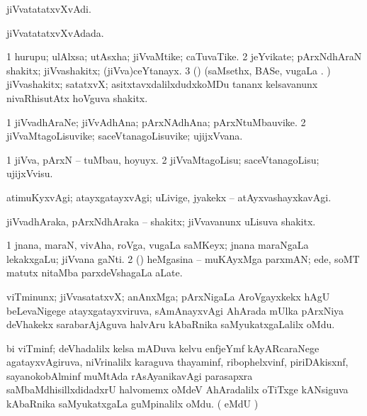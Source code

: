 {{{{{{{{{{{\bentry 
{} 
\gl{\nA}
\expl{}
\bmng
jiVvatatatxvXvAdi. 
\emng
\eentry

\bentry 
{} 
\gl{\gu}
\expl{}
\bmng
jiVvatatatxvXvAdada. 
\emng
\eentry

\bentry
{} 
\gl{\nA}
\expl{}
\bmng
\bnum
\num{1} hurupu; ulAlxsa; utAsxha; jiVvaMtike; caTuvaTike. 
\num{2} jeYvikate; pArxNdhAraN shakitx; jiVvashakitx; (jiVva)ceYtanayx. 
\num{3} (\rUpa) (saMsethx, BASe, \mo vugaLa \vi. ) jiVvashakitx; satatxvX; asitxtavxdalilxdudxkoMDu tananx kelsavanunx nivaRhisutAtx hoVguva shakitx. 
\enum
\emng
\eentry

\bentry
{} 
\gl{\nA}
\expl{}
\bmng
\bnum
\num{1} jiVvadhAraNe; jiVvAdhAna; pArxNAdhAna; pArxNtuMbauvike. 
\num{2} jiVvaMtagoLisuvike; saceVtanagoLisuvike; ujijxVvana. 
\enum
\emng
\eentry

\bentry 
{} 
\gl{\sakirx}
\expl{}
\bmng
\bnum
\num{1} jiVva, pArxN -- tuMbau, hoyuyx. 
\num{2} jiVvaMtagoLisu; saceVtanagoLisu; ujijxVvisu. 
\enum
\emng
\eentry

\bentry 
{} 
\gl{\kirxvi}
\expl{}
\bmng
 atimuKyxvAgi; atayxgatayxvAgi; uLivige, jyakekx -- atAyxvashayxkavAgi. 
\emng
\eentry

\bentry 
{}
\gl{\nA}
\expl{}
\bmng
 jiVvadhAraka, pArxNdhAraka -- shakitx; jiVvavanunx uLisuva shakitx. 
\emng
\eentry

\bentry 
{}
\gl{\nA}
\expl{}
\bmng
\bnum
\num{1} jnana, maraN, vivAha, roVga, \mo vugaLa saMKeyx; jnana maraNgaLa lekakxgaLu; jiVvana gaNti. 
\num{2} (\AmA) heMgasina -- muKAyxMga parxmAN; ede, soMT matutx nitaMba parxdeVshagaLa aLate. 
\enum
\emng
\eentry

\bentry
{} 
\gl{\nA}
\expl{}
\bmng
 viTminunx; jiVvasatatxvX; anAnxMga; pArxNigaLa AroVgayxkekx hAgU beLevaNigege atayxgatayxviruva, sAmAnayxvAgi AhArada mUlka pArxNiya deVhakekx sarabarAjAguva halvAru kAbaRnika saMyukatxgaLalilx oMdu. 
\emng
\eentry

\bentry 
{}
\gl{\nA}
\expl{}
\bmng
\emng
\eentry

\bentry 
{}
\gl{\nA}
\expl{}
\bmng
 bi viTminf; deVhadalilx kelsa mADuva kelvu enfjeYmf kAyARcaraNege agatayxvAgiruva, niVrinalilx karaguva thayaminf, ribophelxvinf, piriDAkisxnf, sayanokobAlminf muMtAda rAsAyanikavAgi parasapxra saMbaMdhisillxdidadxrU halvomemx oMdeV AhAradalilx oTiTxge kANsiguva kAbaRnika saMyukatxgaLa guMpinalilx oMdu. (  eMdU \parx) 
\emng

}}}}}}}}}}}
